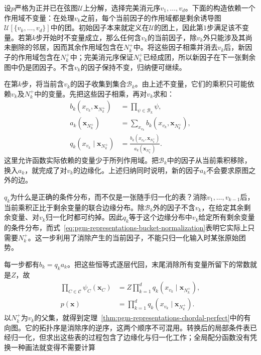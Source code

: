 设$p$严格为正并已在弦图$\mathcal{U}$上分解，选择完美消元序$v_1,\ldots,v_d$。下面的构造依赖一个作用域不变量：在处理$v_k$之前，每个当前因子的作用域都是剩余诱导图$\mathcal{U}[\{v_k,\ldots,v_d\}]$中的团。初始因子本来就定义在$\mathcal{U}$的团上，因此第$1$步满足该不变量。若第$k$步开始时不变量成立，那么任何含$v_k$的当前因子，除$v_k$外只能涉及其尚未删除的邻居，因而其余作用域包含在$N_k^+$中。将这些因子相乘并消去$v_k$后，新因子的作用域包含在$N_k^+$中；完美消元序保证$N_k^+$已经成团，所以新因子在下一张剩余图中仍是团因子。不含$v_k$的因子保持不变，归纳便可继续。

在第$k$步，将当前含$v_k$的因子收集到集合$\mathcal{B}_k$。由上述不变量，它们的乘积只可能依赖$v_k$及$N_k^+$中的变量。先把这些因子相乘，再对$v_k$求和：
\begin{equation}
  \begin{aligned}
    b_k(x_{v_k},\bm{x}_{N_k^+})
    &=\prod_{\psi\in\mathcal{B}_k}\psi,\\
    a_k(\bm{x}_{N_k^+})
    &=\sum_{x_{v_k}}b_k(x_{v_k},\bm{x}_{N_k^+}),\\
    q_k(x_{v_k}\mid\bm{x}_{N_k^+})
    &=\frac{b_k(x_{v_k},\bm{x}_{N_k^+})}
    {a_k(\bm{x}_{N_k^+})}.
  \end{aligned}
  \label{eq:pgm-representations-bucket-normalization}
\end{equation}
这里允许函数实际依赖的变量少于所列作用域。把$\mathcal{B}_k$中的因子从当前乘积移除，换入$a_k$，就完成了对$v_k$的边缘化。上述归纳同时说明，新的因子$a_k$不会要求原图之外的边。

$q_k$为什么是正确的条件分布，而不仅是一张随手归一化的表？消除$v_1,\ldots,v_{k-1}$后，当前乘积正比于剩余变量的联合边缘分布。除$\mathcal{B}_k$外的因子不含$v_k$，在给定其余剩余变量、对$v_k$归一化时都可约掉。因此$q_k$等于这个边缘分布中$v_k$给定所有剩余变量的条件分布，而式~\eqref{eq:pgm-representations-bucket-normalization}表明它实际上只需要$N_k^+$。这一步利用了消除产生的当前因子，不能只归一化输入时某张原始团势。

每一步都有$b_k=q_k a_k$。把这些恒等式逐层代回，末尾消除所有变量所留下的常数就是$Z$，故
\begin{equation}
  \begin{aligned}
    \prod_{C\in\mathcal{C}}\psi_C(\bm{x}_C)
    &=Z\prod_{k=1}^d q_k(x_{v_k}\mid\bm{x}_{N_k^+}),\\
    p(\bm{x})&=\prod_{k=1}^d q_k(x_{v_k}\mid\bm{x}_{N_k^+}).
  \end{aligned}
  \label{eq:pgm-representations-telescoping-product}
\end{equation}
以$N_k^+$为$v_k$的父集，就得到定理~\ref{thm:pgm-representations-chordal-perfect}中的有向图。它的拓扑序是消除序的逆序，这两个顺序不可混用。转换后的局部条件表已经归一化，但求出这些表的过程包含了边缘化与归一化工作；全局配分函数没有凭换一种画法就变得不需要计算

